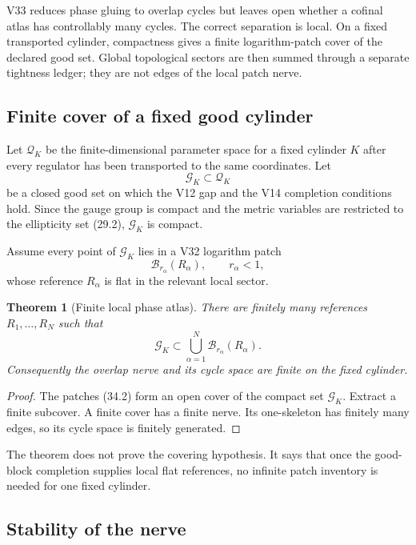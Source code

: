 \documentclass[11pt]{article}
\newtheorem{theorem}{Theorem}[section]
\begin{document}
V33 reduces phase gluing to overlap cycles but leaves open whether a
cofinal atlas has controllably many cycles.  The correct separation is
local.  On a fixed transported cylinder, compactness gives a finite
logarithm-patch cover of the declared good set.  Global topological
sectors are then summed through a separate tightness ledger; they are
not edges of the local patch nerve.

\subsection{Finite cover of a fixed good cylinder}

Let \(\mathcal Q_K\) be the finite-dimensional parameter space for a
fixed cylinder \(K\) after every regulator has been transported to the
same coordinates.  Let
\[
 \mathcal G_K\subset\mathcal Q_K
 \tag{34.1}
\]
be a closed good set on which the V12 gap and the V14 completion
conditions hold.  Since the gauge group is compact and the metric
variables are restricted to the ellipticity set (29.2),
\(\mathcal G_K\) is compact.

Assume every point of \(\mathcal G_K\) lies in a V32 logarithm patch
\[
 \mathcal B_{r_\alpha}(R_\alpha),\qquad r_\alpha<1,
 \tag{34.2}
\]
whose reference \(R_\alpha\) is flat in the relevant local sector.

\begin{theorem}[Finite local phase atlas]
\label{thm:v11v34-finite-atlas}
There are finitely many references
\(R_1,\ldots,R_N\) such that
\[
 \mathcal G_K
 \subset
 \bigcup_{\alpha=1}^N\mathcal B_{r_\alpha}(R_\alpha).
 \tag{34.3}
\]
Consequently the overlap nerve and its cycle space are finite on the
fixed cylinder.
\end{theorem}

\begin{proof}
The patches (34.2) form an open cover of the compact set
\(\mathcal G_K\).  Extract a finite subcover.  A finite cover has a
finite nerve.  Its one-skeleton has finitely many edges, so its cycle
space is finitely generated.
\end{proof}

The theorem does not prove the covering hypothesis.  It says that once
the good-block completion supplies local flat references, no infinite
patch inventory is needed for one fixed cylinder.

\subsection{Stability of the nerve}
\end{document}
